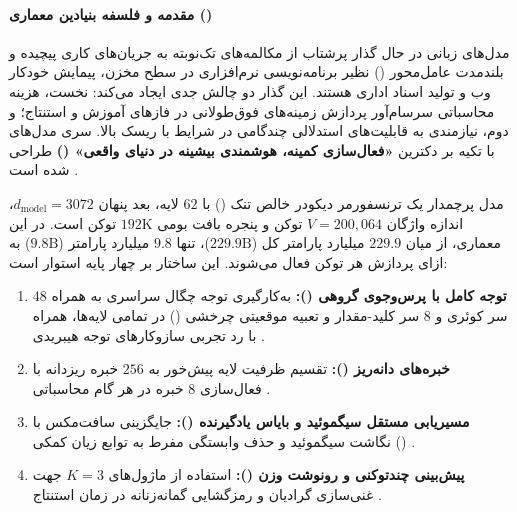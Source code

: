 \item {}

\paragraph*{مقدمه و فلسفه بنیادین معماری ()}
مدل‌های زبانی در حال گذار پرشتاب از مکالمه‌های تک‌نوبته به جریان‌های کاری پیچیده و بلندمدت عامل‌محور () نظیر برنامه‌نویسی نرم‌افزاری در سطح مخزن، پیمایش خودکار وب و تولید اسناد اداری هستند. این گذار دو چالش جدی ایجاد می‌کند: نخست، هزینه محاسباتی سرسام‌آور پردازش زمینه‌های فوق‌طولانی در فازهای آموزش و استنتاج؛ و دوم، نیازمندی به قابلیت‌های استدلالی چندگامی در شرایط با ریسک بالا. سری مدل‌های  با تکیه بر دکترین \textbf{«فعال‌سازی کمینه، هوشمندی بیشینه در دنیای واقعی» ()} طراحی شده است \cite{minimax2026m2}. 

مدل پرچمدار  یک ترنسفورمر دیکودر خالص تنک () با $62$ لایه، بعد پنهان $d_{\text{model}} = 3072$، اندازه واژگان $V = 200{,}064$ توکن و پنجره بافت بومی $192\text{K}$ توکن است. در این معماری، از میان $229.9$ میلیارد پارامتر کل ($229.9\text{B}$)، تنها $9.8$ میلیارد پارامتر ($9.8\text{B}$) به ازای پردازش هر توکن فعال می‌شوند. این ساختار بر چهار پایه استوار است:
\begin{enumerate}
    \item \textbf{توجه کامل با پرس‌وجوی گروهی ():} به‌کارگیری توجه چگال سراسری به همراه $48$ سر کوئری و $8$ سر کلید-مقدار و تعبیه موقعیتی چرخشی () در تمامی لایه‌ها، همراه با رد تجربی سازوکارهای توجه هیبریدی \cite{ainslie2023gqa, su2024roformer}.
    \item \textbf{خبره‌های دانه‌ریز ():} تقسیم ظرفیت لایه پیش‌خور به $256$ خبره ریزدانه با فعال‌سازی $8$ خبره در هر گام محاسباتی \cite{dai2024deepseekmoe}.
    \item \textbf{مسیریابی مستقل سیگموئید و بایاس یادگیرنده ():} جایگزینی سافت‌مکس با نگاشت سیگموئید و حذف وابستگی مفرط به توابع زیان کمکی () \cite{wang2024auxfree}.
    \item \textbf{پیش‌بینی چندتوکنی و رونوشت وزن ():} استفاده از ماژول‌های $K=3$ جهت غنی‌سازی گرادیان و رمزگشایی گمانه‌زنانه در زمان استنتاج \cite{gloeckle2024better, deepseek2024v3, leviathan2023fast}.
\end{enumerate}

